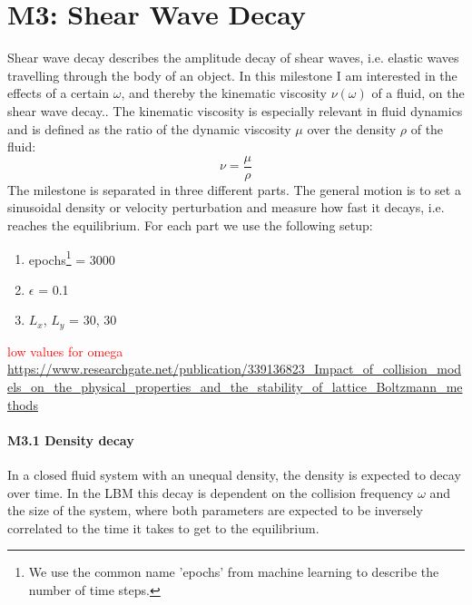 \documentclass[a4paper,11pt, oneside]{book}
\begin{document}
\section{M3: Shear Wave Decay}
Shear wave decay describes the amplitude decay of shear waves, i.e. elastic waves travelling through the body of an object.
In this milestone I am interested in the effects of a certain $\omega$, and thereby the kinematic viscosity $\nu(\omega)$ of a fluid, on the shear wave decay..
The kinematic viscosity is especially relevant in fluid dynamics and is defined as the ratio of the dynamic viscosity $\mu$ over the density $\rho$ of the fluid:
\begin{equation}
\nu = \frac{\mu}{\rho}
\end{equation}
The milestone is separated in three different parts. 
The general motion is to set a sinusoidal density or velocity
perturbation and measure how fast it decays, i.e. reaches the equilibrium.
For each part we use the following setup:
\begin{enumerate}
    \item epochs\footnote{We use the common name 'epochs' from machine learning to describe the number of time steps. } = 3000
    \item $\epsilon$ = 0.1
    \item $L_{x}$, $L_{y}$ = 30, 30
\end{enumerate}

\textcolor{red}{low values for omega \url{https://www.researchgate.net/publication/339136823_Impact_of_collision_models_on_the_physical_properties_and_the_stability_of_lattice_Boltzmann_methods}}

\paragraph{M3.1 Density decay} 
In a closed fluid system with an unequal density, the density is expected to decay over time. In the LBM this decay is dependent on the collision frequency $\omega$ and the size of the system, where both parameters are expected to be inversely correlated to the time it takes to get to the equilibrium.
\end{document}
